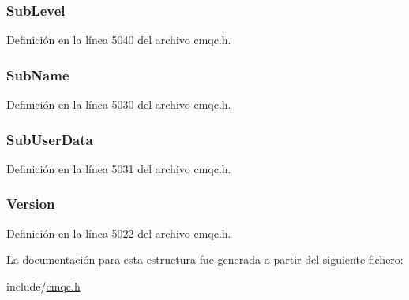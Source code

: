 \subsubsection[{Sub\+Level}]{ Sub\+Level}\label{structtag_m_q_s_d_a380ddfc450dd5ceb714a3d818f82c79b}


Definición en la línea 5040 del archivo cmqc.\+h.

\hypertarget{structtag_m_q_s_d_a52ada97ac3869da3a2f04de08ed4c8d3}{}
\subsubsection[{Sub\+Name}]{ Sub\+Name}\label{structtag_m_q_s_d_a52ada97ac3869da3a2f04de08ed4c8d3}


Definición en la línea 5030 del archivo cmqc.\+h.

\hypertarget{structtag_m_q_s_d_a90378e82138a08e732b9c34cc98479d1}{}
\subsubsection[{Sub\+User\+Data}]{ Sub\+User\+Data}\label{structtag_m_q_s_d_a90378e82138a08e732b9c34cc98479d1}


Definición en la línea 5031 del archivo cmqc.\+h.

\hypertarget{structtag_m_q_s_d_a0656ef8f766b3907d394d88a35d7b7e9}{}
\subsubsection[{Version}]{ Version}\label{structtag_m_q_s_d_a0656ef8f766b3907d394d88a35d7b7e9}


Definición en la línea 5022 del archivo cmqc.\+h.



La documentación para esta estructura fue generada a partir del siguiente fichero\+:\begin{DoxyCompactItemize}
\item 
include/\hyperlink{cmqc_8h}{cmqc.\+h}\end{DoxyCompactItemize}
